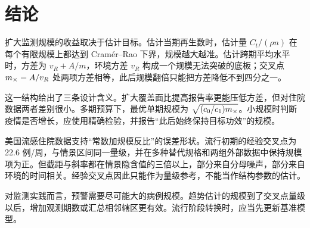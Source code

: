\section{结论}
\label{sec:conclusion}

扩大监测规模的收益取决于估计目标。估计当期再生数时，估计量 $C_t/(\rho n)$ 在每个有限规模上都达到 Cramér--Rao 下界，规模越大越准。估计跨期平均水平时，方差为 $v_R+A/m$，环境方差 $v_R$ 构成一个规模无法突破的底板；交叉点 $m_{\times}=A/v_R$ 处两项方差相等，此后规模翻倍只能把方差降低不到四分之一。

这一结构给出了三条设计含义。扩大覆盖面比提高报告率更能压低方差，但对住院数据两者差别很小。多期预算下，最优单期规模为 $\sqrt{(c_0/c_1)m_{\times}}$。小规模时判断疫情是否增长，应使用精确检验，并报告“此后始终保持目标功效”的规模。

美国流感住院数据支持“常数加规模反比”的误差形状。流行初期的经验交叉点为 22.6 例/周，与情景区间同一量级，并在多种替代规格和两组外部数据中保持规模项为正。但截距与斜率都在情景隐含值的三倍以上，部分来自分母噪声，部分来自环境的时间相关。经验交叉点因此只能作为量级参考，不能当作结构参数的估计。

对监测实践而言，预警需要尽可能大的病例规模。趋势估计的规模到了交叉点量级以后，增加观测期数或汇总相邻辖区更有效。流行阶段转换时，应当先更新基准模型。
